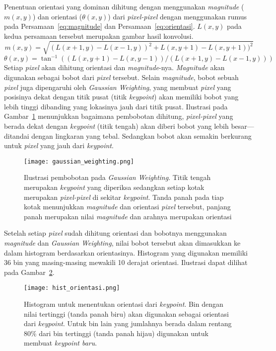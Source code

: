 Penentuan orientasi yang dominan dihitung dengan menggunakan \textit{magnitude} ($m(x,y)$) dan orientasi ($\theta(x,y)$) dari \textit{pixel-pixel} dengan menggunakan rumus pada Persamaan~\ref{eq:magnitude} dan Persamaan~\ref{eq:orientasi}. $L(x,y)$ pada kedua persamaan tersebut merupakan gambar hasil konvolusi.
\begin{equation}
	\label{eq:magnitude}
	m(x,y)=\sqrt{(L(x+1,y)-L(x-1,y))^{2}+L(x,y+1)-L(x,y+1))^{2}}
\end{equation}
\begin{equation}
	\label{eq:orientasi}
	\theta(x,y)=\tan^{-1}((L(x,y+1)-L(x,y-1))/(L(x+1,y)-L(x-1,y)))
\end{equation}
Setiap \textit{pixel} akan dihitung orientasi dan \textit{magnitude}-nya. \textit{Magnitude} akan digunakan sebagai bobot dari \textit{pixel} tersebut. Selain \textit{magnitude}, bobot sebuah \textit{pixel} juga dipengaruhi oleh \textit{Gaussian Weighting}, yang membuat \textit{pixel} yang posisinya dekat dengan titik pusat (titik \textit{keypoint}) akan memiliki bobot yang lebih tinggi dibanding yang lokasinya jauh dari titik pusat. Ilustrasi pada Gambar~\ref{fig:gaussian_weighting} menunjukkan bagaimana pembobotan dihitung, \textit{pixel-pixel} yang berada dekat dengan \textit{keypoint} (titik tengah) akan diberi bobot yang lebih besar---ditandai dengan lingkaran yang tebal. Sedangkan bobot akan semakin berkurang untuk \textit{pixel} yang jauh dari \textit{keypoint}.

\begin{figure}[H]
	\centering
	\texttt{[image: gaussian\_weighting.png]}
	\caption{Ilustrasi pembobotan pada \textit{Gaussian Weighting}. Titik tengah merupakan \textit{keypoint} yang diperiksa sedangkan setiap kotak merupakan \textit{pixel-pixel} di sekitar \textit{keypoint}. Tanda panah pada tiap kotak menunjukkan \textit{magnitude} dan orientasi \textit{pixel} tersebut, panjang panah merupakan nilai \textit{magnitude} dan arahnya merupakan orientasi}
	\label{fig:gaussian_weighting}
\end{figure} 

Setelah setiap \textit{pixel} sudah dihitung orientasi dan bobotnya menggunakan \textit{magnitude} dan \textit{Gaussian Weighting}, nilai bobot tersebut akan dimasukkan ke dalam histogram berdasarkan orientasinya. Histogram yang digunakan memiliki 36 bin yang masing-masing mewakili 10 derajat orientasi. Ilustrasi dapat dilihat pada Gambar~\ref{fig:hist_orientasi}.
\begin{figure}[H]
	\centering
	\texttt{[image: hist\_orientasi.png]}
	\caption{Histogram untuk menentukan orientasi dari \textit{keypoint}. Bin dengan nilai tertinggi (tanda panah biru) akan digunakan sebagai orientasi dari \textit{keypoint}. Untuk bin lain yang jumlahnya berada dalam rentang $80\%$ dari bin tertinggi (tanda panah hijau) digunakan untuk membuat \textit{keypoint baru}.}
	\label{fig:hist_orientasi}
\end{figure}

